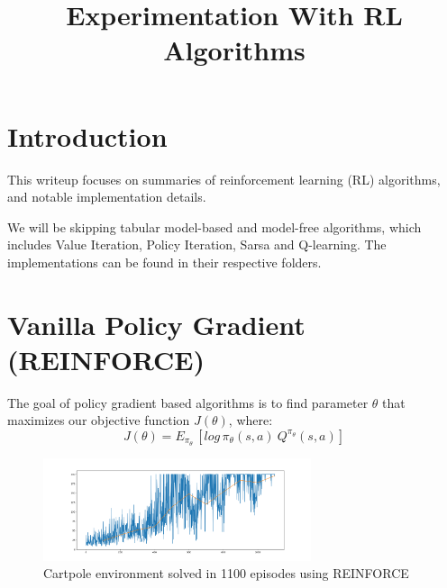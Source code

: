 \documentclass[11pt]{article} %
\title{Experimentation With RL Algorithms}
\author{}
\date{}
\begin{document}
\maketitle

\tableofcontents

\newpage

\section{Introduction}
This writeup focuses on summaries of reinforcement learning (RL) algorithms, and notable implementation details.


We will be skipping tabular model-based and model-free algorithms, which includes Value Iteration, Policy Iteration, Sarsa and Q-learning. The implementations can be found in their respective folders.
\section{Vanilla Policy Gradient (REINFORCE)}
The goal of policy gradient based algorithms is to find parameter $\theta$ that maximizes our objective function $J(\theta)$, where:
\begin{equation*}
    J(\theta) = E_{\pi_\theta}\,[log\,\pi_\theta(s,a)\: Q^{\pi_\theta}(s,a)]
\end{equation*}
\begin{figure}
    \centering
    \includegraphics[width=0.7\textwidth]{vanilla_policy_gradient/Solved_cartpole_1100eps.png}
    \caption{Cartpole environment solved in 1100 episodes using REINFORCE}
\end{figure}
\end{document}
